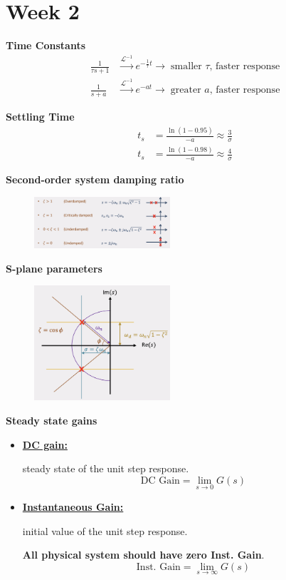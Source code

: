 \section{Week 2}
\textbf{\large Time Constants}
\begin{align*}
    \frac{1}{\tau s + 1} &\xrightarrow{\mathcal{L}^{-1}} e^{-\frac{1}{\tau} t} \to \; \text{smaller $\tau$, faster response} \\
    \frac{1}{s + a} &\xrightarrow{\mathcal{L}^{-1}} e^{-a t} \to \; \text{greater $a$, faster response}
\end{align*}

\textbf{\large Settling Time}
\begin{align*}
    t_s &= \frac{\ln(1-0.95)}{-a} \approx \frac{3}{\sigma} \\
    t_s &= \frac{\ln(1-0.98)}{-a} \approx \frac{4}{\sigma}
\end{align*}

\textbf{\large Second-order system damping ratio}
\begin{figure}[H]
    \centering
    \includegraphics[width=0.45\textwidth]{images/damping_ratio.png}
\end{figure}
\vspace{1cm}

\textbf{\large S-plane parameters}
\begin{figure}[H]
    \centering
    \includegraphics[width=0.45\textwidth]{images/s_plane_parameters.png}
\end{figure}

\textbf{\large Steady state gains}
\begin{itemize}
    \item \textbf{\underline{DC gain:}} 
    
    steady state of the unit step response.
    \begin{equation*}
        \text{DC Gain} = \lim_{s\to 0} G(s) 
    \end{equation*}
    \item \textbf{\underline{Instantaneous Gain:}} 
    
    initial value of the unit step response. 
    
    \textbf{All physical system should have zero Inst. Gain}.
    \begin{equation*}
        \text{Inst. Gain} = \lim_{s\to\infty} G(s)
    \end{equation*}
\end{itemize}



